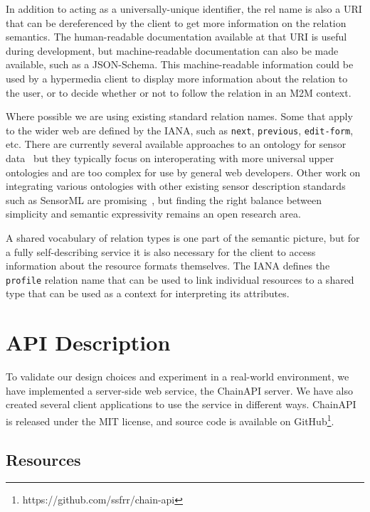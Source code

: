\documentclass{acm_proc_article-sp}
\begin{document}
In addition to acting as a universally-unique identifier, the rel name is also
a URI that can be dereferenced by the client to get more information on the
relation semantics. The human-readable documentation available at that URI is
useful during development, but machine-readable documentation can also be made
available, such as a JSON-Schema. This machine-readable information could be
used by a hypermedia client to display more information about the relation to
the user, or to decide whether or not to follow the relation in an M2M context.

Where possible we are using existing standard relation names. Some that apply
to the wider web are defined by the IANA, such as \texttt{next},
\texttt{previous}, \texttt{edit-form}, etc. There are currently several
available approaches to an ontology for sensor
data~\cite{w3contology}\cite{broring2011}\cite{eid2007} but they typically
focus on interoperating with more universal upper ontologies and are too
complex for use by general web developers. Other work on integrating various
ontologies with other existing sensor description standards such as SensorML
are promising~\cite{russomanno2005}, but finding the right balance between
simplicity and semantic expressivity remains an open research area.

A shared vocabulary of relation types is one part of the semantic picture, but
for a fully self-describing service it is also necessary for the client to
access information about the resource formats themselves. The IANA defines the
\texttt{profile} relation name that can be used to link individual resources to
a shared type that can be used as a context for interpreting its attributes.

\section{API Description}

To validate our design choices and experiment in a real-world environment, we
have implemented a server-side web service, the ChainAPI server. We have also
created several client applications to use the service in different ways.
ChainAPI is released under the MIT license, and source code is available on
GitHub\footnote{https://github.com/ssfrr/chain-api}.

\subsection{Resources}
\label{api_resources}
\end{document}
